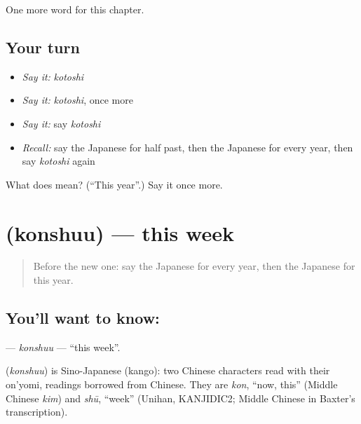 \begin{grammarlens}[title={What you've built}]
One more word for this chapter.
\end{grammarlens}

\subsection*{Your turn}
\begin{itemize}
\raggedright
  \item \emph{Say it:} \emph{kotoshi}
  \item \emph{Say it:} \emph{kotoshi}, once more
  \item \emph{Say it:} say \emph{kotoshi}
  \item \emph{Recall:} say the Japanese for half past, then the Japanese for every year, then say \emph{kotoshi} again
\end{itemize}

\begin{tcolorbox}[breakable,colback=teal!4,colframe=teal!35!black,title={Before you move on}]
What does  mean? (\textquotedblleft{}This year\textquotedblright{}.) Say it once more.
\end{tcolorbox}
\section[\texorpdfstring{\ja{こんしゅう} (konshuu)}{こんしゅう (konshuu)}]{ (konshuu) — this week}

\label{lesson:JA-C75-konshuu}



\begin{quote}
Before the new one: say the Japanese for every year, then the Japanese for this year.
\end{quote}

\subsection*{You'll want to know: }
\textbf{} — \emph{konshuu} — \textquotedblleft{}this week\textquotedblright{}.

\begin{cousinweb}
\textbf{} (\emph{konshuu}) is Sino-Japanese (kango): two Chinese characters read with their on'yomi, readings borrowed from Chinese. They are \emph{kon}, \textquotedblleft{}now, this\textquotedblright{} (Middle Chinese \emph{kim}) and \emph{shū}, \textquotedblleft{}week\textquotedblright{} (Unihan, KANJIDIC2; Middle Chinese in Baxter's transcription).
\end{cousinweb}

